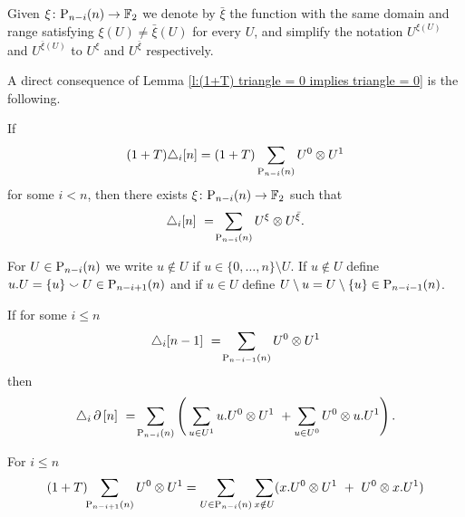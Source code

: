\subsection{}

\begin{notation}
	Given $\xi \colon \P_{n-i}(n) \to \F$ we denote by $\bar{\xi}$ the function with the same domain and range satisfying $\xi(U) \neq \bar{\xi}(U)$ for every $U$, and simplify the notation $U^{\xi(U)}$ and $U^{\bar{\xi}(U)}$ to $U^\xi$ and $U^{\bar{\xi}}$ respectively.
\end{notation}

A direct consequence of Lemma \ref{l:(1+T) triangle = 0 implies triangle = 0} is the following.

\begin{lemma}
    If
    \[
    (1+T) \triangle_i [n] =
    (1+T) \sum_{\P_{n-i}(n)} {U^0} \ot {U^1}
    \]
    for some $i < n$, then there exists $\xi \colon \P_{n-i}(n) \to \F$  such that
    \[
    \triangle_i  [n]\ =\! \sum_{\P_{n-i}(n)} {U^{\xi}} \ot {U^{\bar{\xi}}}.
    \]
\end{lemma}


\begin{notation}
    For $U \in \P_{n-i}(n)$ we write $u \notin U$ if $u \in \{0, \dots, n\} \setminus U$. If $u \notin U$ define $u.U = \{u\} \union U \in \P_{n-i+1}(n)$ and if $u \in U$ define $U \setminus u = U \setminus \{u\} \in \P_{n-i-1}(n)$.
\end{notation}

\begin{lemma} \label{l:triangle boundary}
	If for some $i \leq n$
	\[
	\triangle_i [n-1]\ =\!
	\sum_{\P_{n-i-1}(n)} {U^0} \ot {U^1}
	\]
	then
	\begin{align}
	\label{e:triangle of boundary}
	\triangle_i \bd \, [n] \ =\!
	\sum_{\P_{n-i}(n)} \left( \,
	\sum_{u \in U^1} {u.U^0} \ot {U^1} \ +
	\sum_{u \in U^0} {U^0} \ot {u.U^1} \right).
	\end{align}
\end{lemma}


\begin{lemma} \label{l:boundary gives the lower case}
	For $i \leq n$
	\begin{equation*}
	(1+T) \!\! \sum_{\P_{n-i+1}(n)} {U^0} \ot {U^1} =
	\sum_{U \in \P_{n-i}(n)} \sum_{x \notin U} ({x.U^0} \ot {U^1}\ +\ {U^0} \ot {x.U^1})
	\end{equation*}
\end{lemma}

